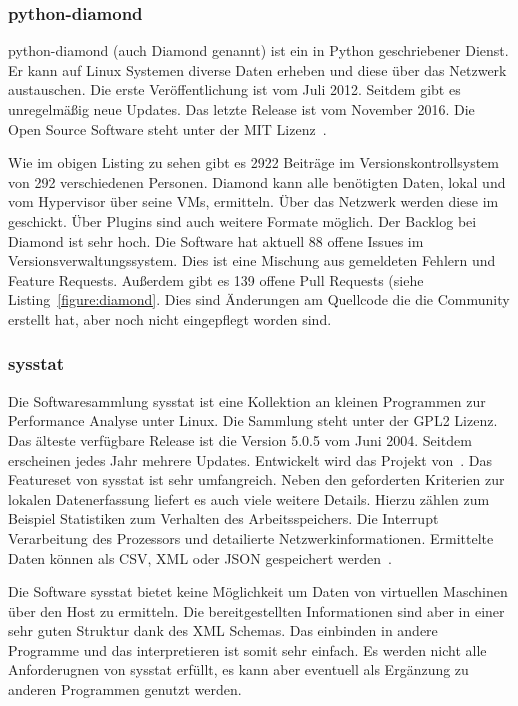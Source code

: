 \subsubsection{python-diamond}
python-diamond (auch Diamond genannt) ist ein in Python geschriebener Dienst.
Er kann auf Linux Systemen diverse Daten erheben und diese über das Netzwerk
austauschen. Die erste Veröffentlichung ist vom Juli 2012. Seitdem gibt es
unregelmäßig neue Updates. Das letzte Release ist vom November 2016. Die Open
Source Software steht unter der MIT Lizenz~\cite{python-diamond}.



Wie im obigen Listing zu sehen gibt es 2922 Beiträge im Versionskontrollsystem
von 292 verschiedenen Personen. Diamond kann alle benötigten Daten, lokal und
vom Hypervisor über seine VMs, ermitteln. Über das Netzwerk werden diese im
 geschickt. Über Plugins sind auch weitere
Formate möglich. Der \gls{Backlog} bei Diamond ist sehr hoch. Die Software hat
aktuell 88 offene Issues im Versionsverwaltungssystem. Dies ist eine Mischung
aus gemeldeten Fehlern und Feature Requests. Außerdem gibt es 139 offene Pull
Requests (siehe Listing~\ref{figure:diamond}. Dies sind Änderungen am
Quellcode die die Community erstellt hat, aber noch nicht eingepflegt worden
sind.
\tm%

\subsubsection{sysstat}
Die Softwaresammlung sysstat ist eine Kollektion an kleinen Programmen zur
Performance Analyse unter Linux. Die Sammlung steht unter der GPL2 Lizenz. Das
älteste verfügbare Release ist die Version 5.0.5 vom Juni 2004. Seitdem
erscheinen jedes Jahr mehrere Updates. Entwickelt wird das Projekt
von~\cite{systat_releases}. Das Featureset von sysstat ist sehr umfangreich.
Neben den geforderten Kriterien zur lokalen Datenerfassung liefert es auch
viele weitere Details. Hierzu zählen zum Beispiel Statistiken zum Verhalten des
Arbeitsspeichers. Die Interrupt Verarbeitung des Prozessors und detailierte
Netzwerkinformationen. Ermittelte Daten können als \gls{CSV}, \gls{XML} oder
\gls{JSON} gespeichert werden~\cite{sysstat_features}.

Die Software sysstat bietet keine Möglichkeit um Daten von virtuellen Maschinen
über den Host zu ermitteln. Die bereitgestellten Informationen sind aber in
einer sehr guten Struktur dank des XML Schemas. Das einbinden in andere
Programme und das interpretieren ist somit sehr einfach. Es werden nicht alle
Anforderugnen von sysstat erfüllt, es kann aber eventuell als Ergänzung zu
anderen Programmen genutzt werden.
\tm%

